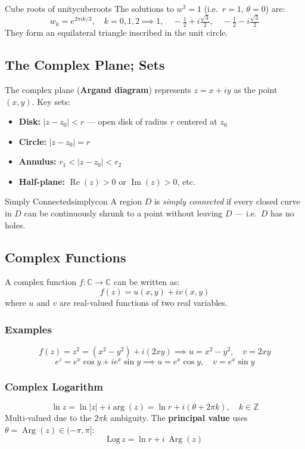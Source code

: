 \documentclass[11pt, letterpaper]{article}
\theoremstyle{plain}
\renewcommand{\Re}{\operatorname{Re}}
\renewcommand{\Im}{\operatorname{Im}}
\DeclareMathOperator{\Arg}{Arg}
\begin{document}
\begin{example}{Cube roots of unity}{cuberoots}
    The solutions to $w^3 = 1$ (i.e.\ $r=1$, $\theta=0$) are:
    \[
        w_k = e^{2\pi ik/3}, \quad k = 0,1,2
        \implies 1,\quad -\tfrac{1}{2}+i\tfrac{\sqrt{3}}{2},\quad
        -\tfrac{1}{2}-i\tfrac{\sqrt{3}}{2}
    \]
    They form an equilateral triangle inscribed in the unit circle.
\end{example}


\subsection{The Complex Plane; Sets}

The complex plane (\textbf{Argand diagram}) represents $z = x+iy$
as the point $(x,y)$. Key sets:
\begin{itemize}
    \item \textbf{Disk:} $|z - z_0| < r$ — open disk of radius $r$ centered at $z_0$
    \item \textbf{Circle:} $|z - z_0| = r$
    \item \textbf{Annulus:} $r_1 < |z - z_0| < r_2$
    \item \textbf{Half-plane:} $\Re(z) > 0$ or $\Im(z) > 0$, etc.
\end{itemize}

\begin{definition}{Simply Connected}{simplycon}
    A region $D$ is \emph{simply connected} if every closed curve in $D$
    can be continuously shrunk to a point without leaving $D$ —
    i.e.\ $D$ has no holes.
\end{definition}


\subsection{Complex Functions}

A complex function $f: \mathbb{C}\to\mathbb{C}$ can be written as:
\[
    f(z) = u(x,y) + iv(x,y)
\]
where $u$ and $v$ are real-valued functions of two real variables.

\subsubsection*{Examples}
\[
    f(z) = z^2 = (x^2 - y^2) + i(2xy)
    \implies u = x^2 - y^2,\quad v = 2xy
\]
\[
    e^z = e^x\cos y + ie^x\sin y
    \implies u = e^x\cos y,\quad v = e^x\sin y
\]

\subsubsection*{Complex Logarithm}
\[
    \ln z = \ln|z| + i\arg(z) = \ln r + i(\theta + 2\pi k), \quad k\in\mathbb{Z}
\]
Multi-valued due to the $2\pi k$ ambiguity. The \textbf{principal value}
uses $\theta = \Arg(z)\in(-\pi,\pi]$:
\[
    \text{Log}\,z = \ln r + i\,\Arg(z)
\]
\end{document}
